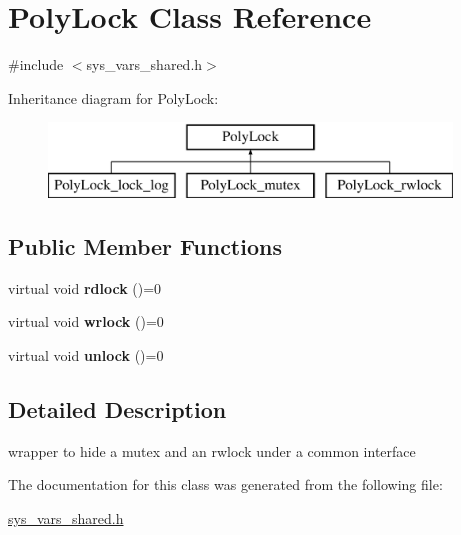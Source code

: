 \hypertarget{classPolyLock}{}\section{Poly\+Lock Class Reference}
\label{classPolyLock}


{\ttfamily \#include $<$sys\+\_\+vars\+\_\+shared.\+h$>$}

Inheritance diagram for Poly\+Lock\+:\begin{figure}[H]
\begin{center}
\leavevmode
\includegraphics[height=2.000000cm]{classPolyLock}
\end{center}
\end{figure}
\subsection*{Public Member Functions}
\begin{DoxyCompactItemize}
\item 
\mbox{\label{classPolyLock_acb7e751fa858e4a30cb98508897235f9}} 
virtual void {\bfseries rdlock} ()=0
\item 
\mbox{\label{classPolyLock_a007610df0d3c1e5e4b83c25b61c82436}} 
virtual void {\bfseries wrlock} ()=0
\item 
\mbox{\label{classPolyLock_af2c1a1fbcc0da878466d1045e17a4c76}} 
virtual void {\bfseries unlock} ()=0
\end{DoxyCompactItemize}


\subsection{Detailed Description}
wrapper to hide a mutex and an rwlock under a common interface 

The documentation for this class was generated from the following file\+:\begin{DoxyCompactItemize}
\item 
\mbox{\hyperlink{sys__vars__shared_8h}{sys\+\_\+vars\+\_\+shared.\+h}}\end{DoxyCompactItemize}
